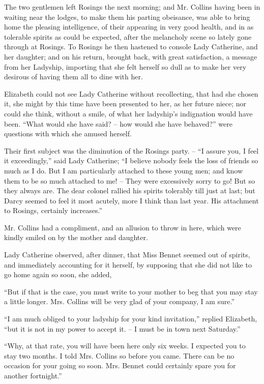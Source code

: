 
The two gentlemen left Rosings the next morning;
and Mr. Collins having been in waiting near the lodges,
to make them his parting obeisance, was able to bring
home the pleasing intelligence, of their appearing in very
good health, and in as tolerable spirits as could be
expected, after the melancholy scene so lately gone
through at Rosings. To Rosings he then hastened to
console Lady Catherine, and her daughter; and on his
return, brought back, with great satisfaction, a message
from her Ladyship, importing that she felt herself so
dull as to make her very desirous of having them all to
dine with her.

Elizabeth could not see Lady Catherine without recollecting,
that had she chosen it, she might by this time
have been presented to her, as her future niece; nor
could she think, without a smile, of what her ladyship’s
indignation would have been. “What would she have
said? -- how would she have behaved?” were questions
with which she amused herself.

Their first subject was the diminution of the Rosings
party. -- “I assure you, I feel it exceedingly,” said Lady
Catherine; “I believe nobody feels the loss of friends so
much as I do. But I am particularly attached to these
young men; and know them to be so much attached to
me! -- They were excessively sorry to go! But so they
always are. The dear colonel rallied his spirits tolerably
till just at last; but Darcy seemed to feel it most acutely,
more I think than last year. His attachment to Rosings,
certainly increases.”

Mr. Collins had a compliment, and an allusion to throw
in here, which were kindly smiled on by the mother and
daughter.

Lady Catherine observed, after dinner, that Miss
Bennet seemed out of spirits, and immediately accounting
for it herself, by supposing that she did not like to
go home again so soon, she added,

“But if that is the case, you must write to your mother
to beg that you may stay a little longer. Mrs. Collins
will be very glad of your company, I am sure.”

“I am much obliged to your ladyship for your kind
invitation,” replied Elizabeth, “but it is not in my power
to accept it. -- I must be in town next Saturday.”

“Why, at that rate, you will have been here only six
weeks. I expected you to stay two months. I told Mrs.
Collins so before you came. There can be no occasion
for your going so soon. Mrs. Bennet could certainly spare
you for another fortnight.”

